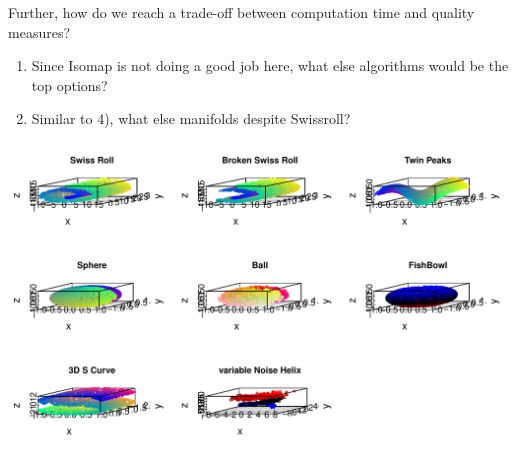 \documentclass[11pt,a4paper,]{article}
\begin{document}
Further, how do we reach a trade-off between computation time and quality measures?

\begin{enumerate}
\def\labelenumi{\arabic{enumi})}
\setcounter{enumi}{3}
\item
  Since Isomap is not doing a good job here, what else algorithms would be the top options?
\item
  Similar to 4), what else manifolds despite Swissroll?
\end{enumerate}

\includegraphics{Simulation_files/figure-latex/manifolds-1.pdf}

\setlength{\parindent}{-0.2in}
\setlength{\leftskip}{0.2in}
\setlength{\parskip}{8pt}
\vspace*{-0.2in}

\noindent

\printbibliography
\end{document}
